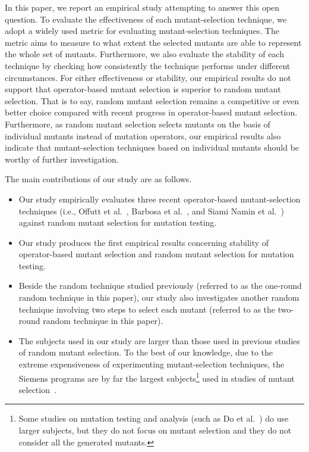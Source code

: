 In this paper, we report an empirical study attempting to answer
this open question. To evaluate the effectiveness of each
mutant-selection technique, we adopt a widely used metric for
evaluating mutant-selection techniques. The metric aims to measure
to what extent the selected mutants are able to represent the
whole set of mutants. Furthermore, we also evaluate the stability
of each technique by checking how consistently the technique
performs under different circumstances. For either effectiveness
or stability, our empirical results do not support that
operator-based mutant selection is superior to random mutant
selection. That is to say, random mutant selection remains a
competitive or even better choice compared with recent progress in
operator-based mutant selection. Furthermore, as random mutant
selection selects mutants on the basis of individual mutants
instead of mutation operators, our empirical results also indicate
that mutant-selection techniques based on individual mutants
should be worthy of further investigation.

The main contributions of our study are as follows.


\begin{itemize}
\vspace{-2ex}

\item Our study empirically evaluates three recent operator-based
mutant-selection techniques (i.e., Offutt et al.~\cite{Offutt:96},
Barbosa et al.~\cite{Barbosa:01}, and Siami Namin et
al.~\cite{SiamiNamin:08}) against random mutant selection for
mutation testing.\vspace{-2ex}

\item Our study produces the first empirical results concerning
stability of operator-based mutant selection and random mutant
selection for mutation testing. \vspace{-2ex}

\item Beside the random technique studied previously (referred to as
the one-round random technique in this paper), our study also
investigates another random technique involving two steps to select
each mutant (referred to as the two-round random technique in this
paper).\vspace{-2ex}

\item The subjects used in our study are larger than those used in
previous studies of random mutant selection. To the best of our
knowledge, due to the extreme expensiveness of experimenting
mutant-selection techniques, the Siemens programs are by far the
largest subjects\footnote{Some studies on mutation testing and
analysis (such as Do et al.~\cite{Do:06}) do use larger subjects,
but they do not focus on mutant selection and they do not consider
all the generated mutants.} used in studies of mutant
selection~\cite{SiamiNamin:08}. \vspace{-2ex}

\end{itemize}

